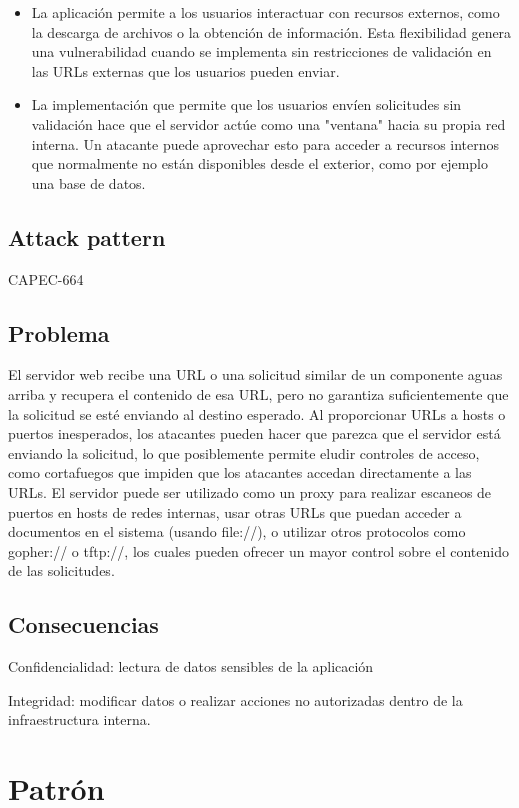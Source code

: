 \begin{itemize}
    \item La aplicación permite a los usuarios interactuar con recursos externos, como la descarga de archivos o la obtención de información. Esta flexibilidad genera una vulnerabilidad cuando se implementa sin restricciones de validación en las URLs externas que los usuarios pueden enviar.
    \item La implementación que permite que los usuarios envíen solicitudes sin validación hace que el servidor actúe como una "ventana" hacia su propia red interna. Un atacante puede aprovechar esto para acceder a recursos internos que normalmente no están disponibles desde el exterior, como por ejemplo una base de datos. 
\end{itemize}

\subsection{Attack pattern}
CAPEC-664
\subsection{Problema}

El servidor web recibe una URL o una solicitud similar de un componente aguas arriba y recupera el contenido de esa URL, pero no garantiza suficientemente que la solicitud se esté enviando al destino esperado.
Al proporcionar URLs a hosts o puertos inesperados, los atacantes pueden hacer que parezca que el servidor está enviando la solicitud, lo que posiblemente permite eludir controles de acceso, como cortafuegos que impiden que los atacantes accedan directamente a las URLs. El servidor puede ser utilizado como un proxy para realizar escaneos de puertos en hosts de redes internas, usar otras URLs que puedan acceder a documentos en el sistema (usando file://), o utilizar otros protocolos como gopher:// o tftp://, los cuales pueden ofrecer un mayor control sobre el contenido de las solicitudes.

\subsection{Consecuencias}

Confidencialidad: lectura de datos sensibles de la aplicación

Integridad: modificar datos o realizar acciones no autorizadas dentro de la infraestructura interna.

\section{Patrón}
